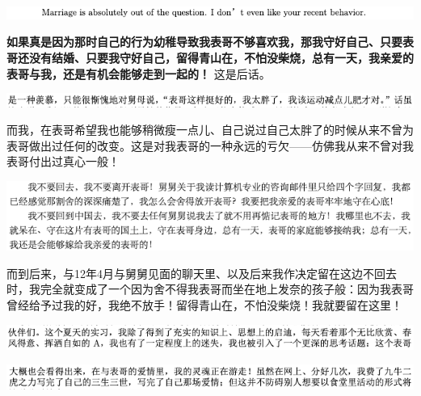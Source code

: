 \documentclass[9pt, b5paper]{article}
\begin{document}
\begin{center}
\includegraphics[width=.9\linewidth]{./pic/backups_plans_20210426_165635.png}
\end{center}

\textbf{如果真是因为那时自己的行为幼稚导致我表哥不够喜欢我，那我守好自己、只要表哥还没有结婚、只要我守好自己，留得青山在，不怕没柴烧，总有一天，我亲爱的表哥与我，还是有机会能够走到一起的！} 这是后话。

\begin{center}
\includegraphics[width=.9\linewidth]{./pic/backups_plans_20210426_163905.png}
\end{center}

而我，在表哥希望我也能够稍微瘦一点儿、自己说过自己太胖了的时候从来不曾为表哥做出过任何的改变。这是对我表哥的一种永远的亏欠——仿佛我从来不曾对我表哥付出过真心一般！

\begin{center}
\includegraphics[width=.9\linewidth]{./pic/backups_plans_20210426_164137.png}
\end{center}

而到后来，与12年4月与舅舅见面的聊天里、以及后来我作决定留在这边不回去时，我完全就变成了一个因为舍不得我表哥而坐在地上发奈的孩子般：因为我表哥曾经给予过我的好，我绝不放手！留得青山在，不怕没柴烧！我就要留在这里！

\begin{center}
\includegraphics[width=.9\linewidth]{./pic/backups_plans_20210426_113411.png}
\end{center}

\begin{center}
\includegraphics[width=.9\linewidth]{./pic/backups_plans_20210426_113704.png}
\end{center}
\end{document}
